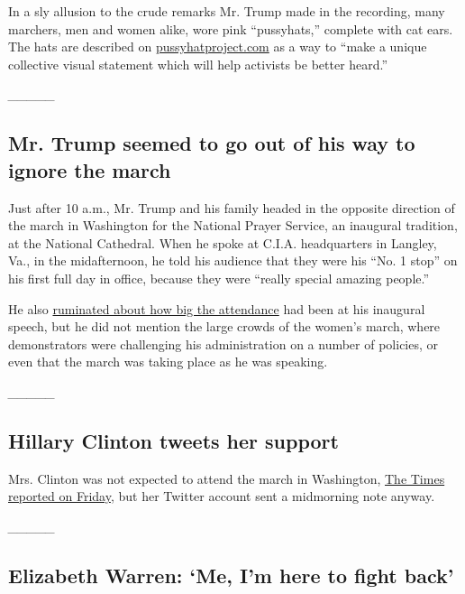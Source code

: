 In a sly allusion to the crude remarks Mr. Trump made in the recording,
many marchers, men and women alike, wore pink ``pussyhats,'' complete
with cat ears. The hats are described on
\href{https://www.pussyhatproject.com/}{pussyhatproject.com} as a way to
``make a unique collective visual statement which will help activists be
better heard.''

\emph{\_\_\_\_\_}

\hypertarget{mr-trump-seemed-to-go-out-of-his-way-to-ignore-the-march}{%
\subsection{Mr. Trump seemed to go out of his way to ignore the
march}\label{mr-trump-seemed-to-go-out-of-his-way-to-ignore-the-march}}

Just after 10 a.m., Mr. Trump and his family headed in the opposite
direction of the march in Washington for the National Prayer Service, an
inaugural tradition, at the National Cathedral. When he spoke at C.I.A.
headquarters in Langley, Va., in the midafternoon, he told his audience
that they were his ``No. 1 stop'' on his first full day in office,
because they were ``really special amazing people.''

He also
\href{https://www.nytimes.com/2017/01/21/us/politics/trump-white-house-briefing-inauguration-crowd-size.html}{ruminated
about how big the attendance} had been at his inaugural speech, but he
did not mention the large crowds of the women's march, where
demonstrators were challenging his administration on a number of
policies, or even that the march was taking place as he was speaking.

\emph{\_\_\_\_\_}

\hypertarget{hillary-clinton-tweets-her-support}{%
\subsection{Hillary Clinton tweets her
support}\label{hillary-clinton-tweets-her-support}}

Mrs. Clinton was not expected to attend the march in Washington,
\href{https://www.nytimes.com/2017/01/20/us/politics/hillary-clinton-donald-trump-inauguration.html}{The
Times reported on Friday}, but her Twitter account sent a midmorning
note anyway.

\emph{\_\_\_\_\_}

\hypertarget{elizabeth-warren-me-im-here-to-fight-back}{%
\subsection{Elizabeth Warren: `Me, I'm here to fight
back'}\label{elizabeth-warren-me-im-here-to-fight-back}}


